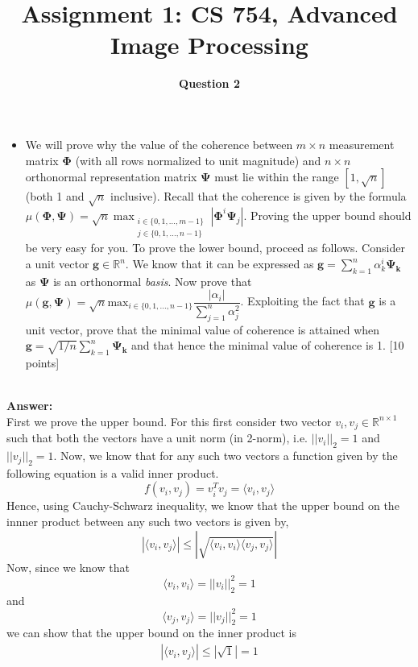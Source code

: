 \documentclass[12pt]{article}
\title{Assignment 1: CS 754, Advanced Image Processing}
\author{\textbf{Question 2}}
\date{}
\begin{document}
\maketitle

\begin{itemize}
    \item We will prove why the value of the coherence between $m \times n$ measurement matrix $\boldsymbol{\Phi}$ (with all rows normalized to unit magnitude) and $n \times n$ orthonormal representation matrix $\boldsymbol{\Psi}$ must lie within the range $[1,\sqrt{n}]$ (both 1 and $\sqrt{n}$ inclusive).
Recall that the coherence is given by the formula \\
$\mu(\boldsymbol{\Phi},\boldsymbol{\Psi}) = \sqrt{n} \max_{\substack{i \in \{0,1,...,m-1\}  \\ j \in \{0,1,...,n-1\} }} \left|\boldsymbol{\Phi}^i \boldsymbol{\Psi}_j \right|$. 
Proving the upper bound should be very easy for you. To prove the lower bound, proceed as follows. Consider a unit vector $\boldsymbol{g} \in \mathbb{R}^n$. We know that it can be expressed as $\boldsymbol{g} = \sum_{k=1}^n \alpha_k^i \boldsymbol{\Psi_k}$ as $\boldsymbol{\Psi}$ is an orthonormal \emph{basis}. Now prove that $\mu(\boldsymbol{g},\boldsymbol{\Psi}) = \sqrt{n} \textrm{max}_{i \in \{0,1,...,n-1\}} \dfrac{|\alpha_i|}{\sum_{j=1}^n \alpha^2_j}$. Exploiting the fact that $\boldsymbol{g}$ is a unit vector, prove that the minimal value of coherence is attained when $\boldsymbol{g} = \sqrt{1/n} \sum_{k=1}^n \boldsymbol{\Psi_k}$ and that hence the minimal value of coherence is 1. \textsf{[10 points]}
\end{itemize}
\vspace*{0.5cm}\\
\textbf{Answer:} \\
First we prove the upper bound. For this first consider two vector $v_i, v_j \in \mathbb{R}^{n \times 1}$ such that both the vectors have a unit norm (in 2-norm), i.e. $ ||v_i||_2 =1$ and $ ||v_j||_2 =1$. Now, we know that for any such two vectors a function given by the following equation is a valid inner product.
$$ f(v_i, v_j) = v_i^Tv_j = \langle v_i, v_j \rangle $$
Hence, using Cauchy-Schwarz inequality, we know that the upper bound on the innner product between any such two vectors is given by,
$$ | \langle v_i, v_j \rangle | \leq | \sqrt{ \langle v_i, v_i \rangle  \langle v_j, v_j \rangle}|$$
Now, since we know that \\
$$ \langle v_i, v_i \rangle = || v_i ||_2^2 = 1 $$
and \\
$$ \langle v_j, v_j \rangle = || v_j ||_2^2 = 1 $$
we can show that the upper bound on the inner product is \\
\begin{gather}
 | \langle v_i, v_j \rangle | \leq |\sqrt{1} | = 1 
\end{gather}
\\
\end{document}
